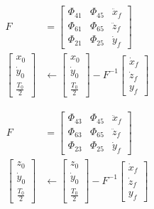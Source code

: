 \documentclass[conf]{new-aiaa}
\begin{document}
\begin{multicols*}{2}
\begin{equation}
    \begin{aligned}
        F &= \begin{bmatrix} \Phi_{41} & \Phi_{45} & \ddot{x}_f \\
                             \Phi_{61} & \Phi_{65} & \ddot{z}_f \\
                             \Phi_{21} & \Phi_{25} & \dot{y}_f \end{bmatrix} \\
        \begin{bmatrix} x_0 \\ \dot{y}_0 \\ \frac{T_0}{2} \end{bmatrix} & \leftarrow 
        \begin{bmatrix} x_0 \\ \dot{y}_0 \\ \frac{T_0}{2} \end{bmatrix} - F^{-1} 
        \begin{bmatrix} \dot{x}_f \\ \dot{z}_f \\ y_f \end{bmatrix}
    \end{aligned}
\end{equation}

\begin{equation}
    \begin{aligned}
        F &= \begin{bmatrix} \Phi_{43} & \Phi_{45} & \ddot{x}_f \\
                             \Phi_{63} & \Phi_{65} & \ddot{z}_f \\
                             \Phi_{23} & \Phi_{25} & \dot{y}_f \end{bmatrix} \\
        \begin{bmatrix} z_0 \\ \dot{y}_0 \\ \frac{T_0}{2} \end{bmatrix} & \leftarrow 
        \begin{bmatrix}z_0 \\ \dot{y}_0 \\ \frac{T_0}{2} \end{bmatrix} - F^{-1} 
        \begin{bmatrix} \dot{x}_f \\ \dot{z}_f \\ y_f \end{bmatrix}
    \end{aligned}
\end{equation}


\end{multicols*}
\end{document}
